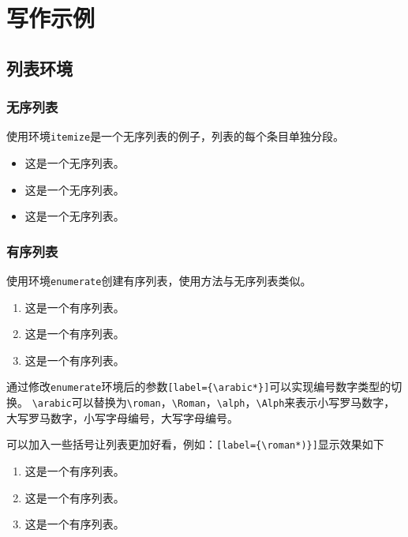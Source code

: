 \chapter{写作示例}
\songti{}
\linespread{1.67} \selectfont

\section{列表环境}

\subsection{无序列表}

使用环境\verb+itemize+是一个无序列表的例子，列表的每个条目单独分段。

\begin{itemize}
	\item 这是一个无序列表。
	\item 这是一个无序列表。
	\item 这是一个无序列表。
\end{itemize}

\subsection{有序列表}

使用环境\verb+enumerate+创建有序列表，使用方法与无序列表类似。

\begin{enumerate}[label={(\arabic*)}]
	\item 这是一个有序列表。
	\item 这是一个有序列表。
	\item 这是一个有序列表。
\end{enumerate}

通过修改\verb+enumerate+环境后的参数\verb+[label={\arabic*}]+可以实现编号数字类型的切换。
\verb+\arabic+可以替换为\verb+\roman+，\verb+\Roman+，\verb+\alph+，\verb+\Alph+来表示小写罗马数字，大写罗马数字，小写字母编号，大写字母编号。

可以加入一些括号让列表更加好看，例如：\verb+[label={\roman*)}]+显示效果如下

\begin{enumerate}[label={\roman*)}]
	\item 这是一个有序列表。
	\item 这是一个有序列表。
	\item 这是一个有序列表。
\end{enumerate}
